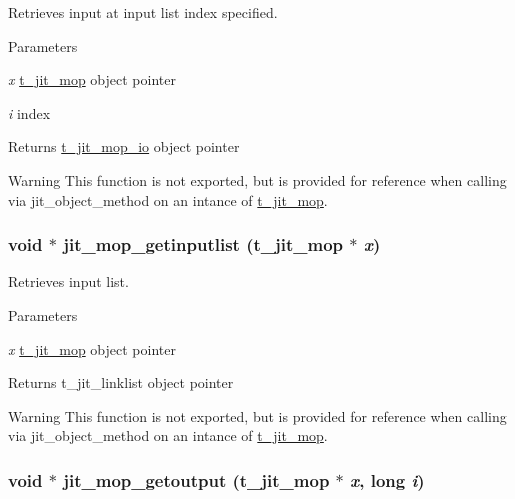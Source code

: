 Retrieves input at input list index specified. 
\begin{DoxyParams}{Parameters}
\item[{\em x}]\hyperlink{structt__jit__mop}{t\_\-jit\_\-mop} object pointer \item[{\em i}]index\end{DoxyParams}
\begin{DoxyReturn}{Returns}
\hyperlink{structt__jit__mop__io}{t\_\-jit\_\-mop\_\-io} object pointer
\end{DoxyReturn}
\begin{DoxyWarning}{Warning}
This function is not exported, but is provided for reference when calling via jit\_\-object\_\-method on an intance of \hyperlink{structt__jit__mop}{t\_\-jit\_\-mop}. 
\end{DoxyWarning}
\hypertarget{group__mopmod_ga311291c98d02778c52d096c591b782af}{
\subsubsection[{jit\_\-mop\_\-getinputlist}]{\setlength{\rightskip}{0pt plus 5cm}void $\ast$ jit\_\-mop\_\-getinputlist ({\bf t\_\-jit\_\-mop} $\ast$ {\em x})}}
\label{group__mopmod_ga311291c98d02778c52d096c591b782af}


Retrieves input list. 
\begin{DoxyParams}{Parameters}
\item[{\em x}]\hyperlink{structt__jit__mop}{t\_\-jit\_\-mop} object pointer\end{DoxyParams}
\begin{DoxyReturn}{Returns}
t\_\-jit\_\-linklist object pointer
\end{DoxyReturn}
\begin{DoxyWarning}{Warning}
This function is not exported, but is provided for reference when calling via jit\_\-object\_\-method on an intance of \hyperlink{structt__jit__mop}{t\_\-jit\_\-mop}. 
\end{DoxyWarning}
\hypertarget{group__mopmod_ga372b391a6398e456818fbd9b0a023ea8}{
\subsubsection[{jit\_\-mop\_\-getoutput}]{\setlength{\rightskip}{0pt plus 5cm}void $\ast$ jit\_\-mop\_\-getoutput ({\bf t\_\-jit\_\-mop} $\ast$ {\em x}, \/  long {\em i})}}
\label{group__mopmod_ga372b391a6398e456818fbd9b0a023ea8}


